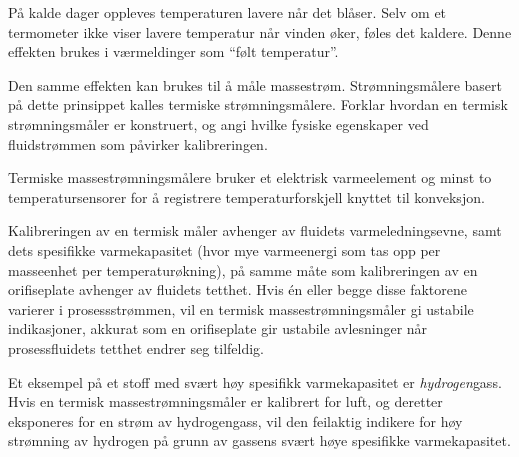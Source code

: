 

På kalde dager oppleves temperaturen lavere når det blåser. Selv om et termometer ikke viser lavere temperatur når vinden øker, føles det kaldere. Denne effekten brukes i værmeldinger som ``følt temperatur''.

Den samme effekten kan brukes til å måle massestrøm. Strømningsmålere basert på dette prinsippet kalles termiske strømningsmålere. Forklar hvordan en termisk strømningsmåler er konstruert, og angi hvilke fysiske egenskaper ved fluidstrømmen som påvirker kalibreringen.







Termiske massestrømningsmålere bruker et elektrisk varmeelement og minst to temperatursensorer for å registrere temperaturforskjell knyttet til konveksjon.

Kalibreringen av en termisk måler avhenger av fluidets varmeledningsevne, samt dets spesifikke varmekapasitet (hvor mye varmeenergi som tas opp per masseenhet per temperaturøkning), på samme måte som kalibreringen av en orifiseplate avhenger av fluidets tetthet. Hvis én eller begge disse faktorene varierer i prosessstrømmen, vil en termisk massestrømningsmåler gi ustabile indikasjoner, akkurat som en orifiseplate gir ustabile avlesninger når prosessfluidets tetthet endrer seg tilfeldig.

\vskip 10pt

Et eksempel på et stoff med svært høy spesifikk varmekapasitet er \textit{hydrogen}gass. Hvis en termisk massestrømningsmåler er kalibrert for luft, og deretter eksponeres for en strøm av hydrogengass, vil den feilaktig indikere for høy strømning av hydrogen på grunn av gassens svært høye spesifikke varmekapasitet.









